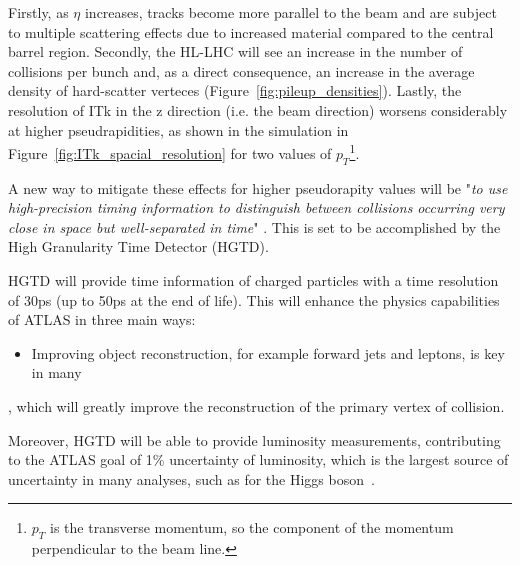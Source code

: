 Firstly, as $\eta$ increases, tracks become more parallel to the beam and are subject to multiple scattering effects due to increased material compared to the central barrel region. Secondly, the HL-LHC will see an increase in the number of collisions per bunch and, as a direct consequence, an increase in the average density of hard-scatter verteces (Figure~\ref{fig:pileup_densities}). Lastly, the resolution of ITk in the z direction (i.e. the beam direction) worsens considerably at higher pseudrapidities, as shown in the simulation in Figure~\ref{fig:ITk_spacial_resolution} for two values of $p_T$\footnote{$p_T$ is the transverse momentum, so the component of the momentum perpendicular to the beam line.}.

A new way to mitigate these effects for higher pseudorapity values will be "\textit{to use high-precision timing information to distinguish between collisions occurring very close in space but well-separated in time}" \cite{CERN-LHCC-2020-007}. This is set to be accomplished by the High Granularity Time Detector (HGTD).

HGTD will provide time information of charged particles with a time resolution of 30ps (up to 50ps at the end of life). This will enhance the physics capabilities of ATLAS in three main ways:
\begin{itemize}
    \item Improving object reconstruction, for example forward jets and leptons, is key in many 
\end{itemize}

, which will greatly improve the reconstruction of the primary vertex of collision. 



Moreover, HGTD will be able to provide luminosity measurements, contributing to the ATLAS goal of 1\% uncertainty of luminosity, which is the largest source of uncertainty in many analyses, such as for the Higgs boson~\cite{CERN-LHCC-2020-007}.

